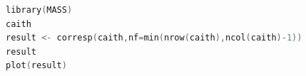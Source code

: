 \begin{lstlisting}[language=c++,label={code:14_01},caption={双対尺度法による分析}]
library(MASS)
caith
result <- corresp(caith,nf=min(nrow(caith),ncol(caith)-1))
result
plot(result)
\end{lstlisting}
